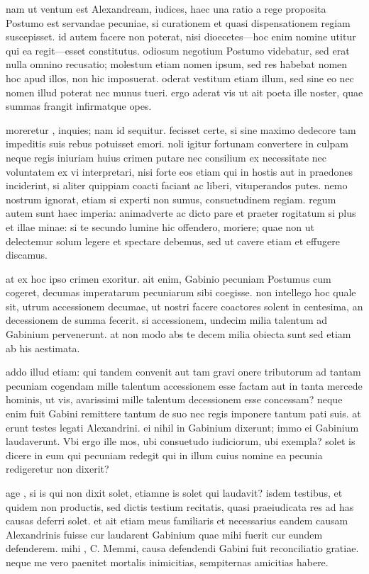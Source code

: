  nam ut ventum est Alexandream, iudices, haec una ratio a rege proposita Postumo est servandae pecuniae, si curationem et quasi dispensationem regiam suscepisset. id autem facere non poterat, nisi dioecetes—hoc enim nomine utitur qui ea regit—esset constitutus. odiosum negotium Postumo videbatur, sed erat nulla omnino recusatio; molestum etiam nomen ipsum, sed res habebat nomen hoc apud illos, non hic imposuerat. oderat vestitum etiam illum, sed sine eo nec nomen illud poterat nec munus tueri. ergo aderat vis ut ait poeta ille noster, quae summas frangit infirmatque opes.

 moreretur , inquies; nam id sequitur. fecisset certe, si sine maximo dedecore tam impeditis suis rebus potuisset emori. noli igitur fortunam convertere in culpam neque regis iniuriam huius crimen putare nec consilium ex necessitate nec voluntatem ex vi interpretari, nisi forte eos etiam qui in hostis aut in praedones inciderint, si aliter quippiam coacti faciant ac liberi, vituperandos putes. nemo nostrum ignorat, etiam si experti non sumus, consuetudinem regiam. regum autem sunt haec imperia: animadverte ac dicto pare et praeter rogitatum si plus et illae minae: si te secundo lumine hic offendero, moriere; quae non ut delectemur solum legere et spectare debemus, sed ut cavere etiam et effugere discamus.

 at ex hoc ipso crimen exoritur. ait enim, Gabinio pecuniam Postumus cum cogeret, decumas imperatarum pecuniarum sibi coegisse. non intellego hoc quale sit, utrum accessionem decumae, ut nostri facere coactores solent in centesima, an decessionem de summa fecerit. si accessionem, undecim milia talentum ad Gabinium pervenerunt. at non modo abs te decem milia obiecta sunt sed etiam ab his aestimata.

 addo illud etiam: qui tandem convenit aut tam gravi onere tributorum ad tantam pecuniam cogendam mille talentum accessionem esse factam aut in tanta mercede hominis, ut vis, avarissimi mille talentum decessionem esse concessam? neque enim fuit Gabini remittere tantum de suo nec regis imponere tantum pati suis. at erunt testes legati Alexandrini. ei nihil in Gabinium dixerunt; immo ei Gabinium laudaverunt. Vbi ergo ille mos, ubi consuetudo iudiciorum, ubi exempla? solet is dicere in eum qui pecuniam redegit qui in illum cuius nomine ea pecunia redigeretur non dixerit?

 age , si is qui non dixit solet, etiamne is solet qui laudavit? isdem testibus, et quidem non productis, sed dictis testium recitatis, quasi praeiudicata res ad has causas deferri solet. et ait etiam meus familiaris et necessarius eandem causam Alexandrinis fuisse cur laudarent Gabinium quae mihi fuerit cur eundem defenderem. mihi , C. Memmi, causa defendendi Gabini fuit reconciliatio gratiae. neque me vero paenitet mortalis inimicitias, sempiternas amicitias habere.

